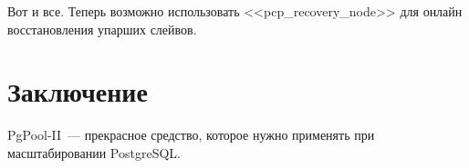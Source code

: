 \begin{itemize}
\end{itemize}

Вот и все. Теперь возможно использовать <<pcp\_recovery\_node>> для онлайн восстановления упарших слейвов.


\section{Заключение}
PgPool-II~--- прекрасное средство, которое нужно применять при масштабировании PostgreSQL.

